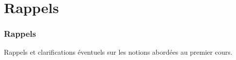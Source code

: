 \section{Rappels}

\frame
{
	\frametitle{Rappels}
	Rappels et clarifications \'eventuels sur les notions abord\'ees au premier cours.
}

